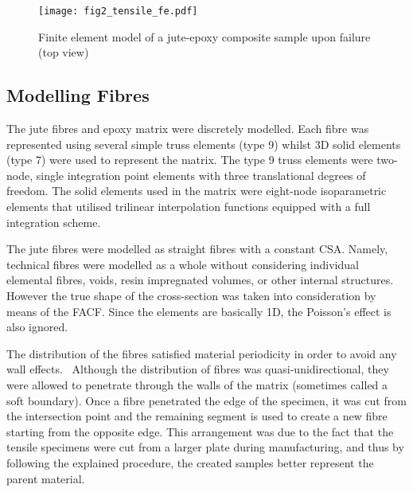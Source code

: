 	\begin{figure}[t!]%
		\centering
		\texttt{[image: fig2\_tensile\_fe.pdf]}
		\caption{Finite element model of a jute-epoxy composite sample upon failure (top view)}\label{fig:fe}
	\end{figure}

\subsection{Modelling Fibres}	
	The jute fibres and epoxy matrix were discretely modelled. Each fibre was represented using several simple truss elements (type 9) whilst 3D solid elements (type 7) were used to represent the matrix. The type 9 truss elements were two-node, single integration point elements with three translational degrees of freedom. The solid elements used in the matrix were eight-node isoparametric elements that utilised trilinear interpolation functions equipped with a full integration scheme. 
	
	The jute fibres were modelled as straight fibres with a constant CSA. Namely, technical fibres were modelled as a whole without considering individual elemental fibres, voids, resin impregnated volumes, or other internal structures. However the true shape of the cross-section was taken into consideration by means of the FACF. Since the elements are basically 1D, the Poisson's effect is also ignored.
	
	The distribution of the fibres satisfied material periodicity in order to avoid any wall effects.~\autocite{Miehe.2002} Although the distribution of fibres was quasi-unidirectional, they were allowed to penetrate through the walls of the matrix (sometimes called a soft boundary). Once a fibre penetrated the edge of the specimen, it was cut from the intersection point and the remaining segment is used to create a new fibre starting from the opposite edge. This arrangement was due to the fact that the tensile specimens were cut from a larger plate during manufacturing, and thus by following the explained procedure, the created samples better represent the parent material.
	
